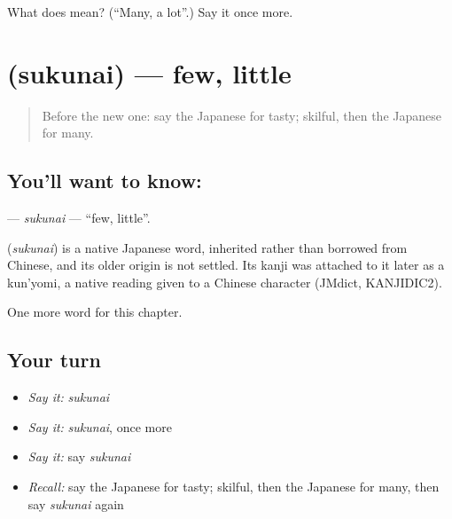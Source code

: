 \begin{tcolorbox}[breakable,colback=teal!4,colframe=teal!35!black,title={Before you move on}]
What does  mean? (\textquotedblleft{}Many, a lot\textquotedblright{}.) Say it once more.
\end{tcolorbox}
\section[\texorpdfstring{\ja{すくない} (sukunai)}{すくない (sukunai)}]{ (sukunai) — few, little}

\label{lesson:JA-C127-sukunai}



\begin{quote}
Before the new one: say the Japanese for tasty; skilful, then the Japanese for many.
\end{quote}

\subsection*{You'll want to know: }
\textbf{} — \emph{sukunai} — \textquotedblleft{}few, little\textquotedblright{}.

\begin{cousinweb}
\textbf{} (\emph{sukunai}) is a native Japanese word, inherited rather than borrowed from Chinese, and its older origin is not settled. Its kanji was attached to it later as a kun'yomi, a native reading given to a Chinese character (JMdict, KANJIDIC2).
\end{cousinweb}

\begin{grammarlens}[title={What you've built}]
One more word for this chapter.
\end{grammarlens}

\subsection*{Your turn}
\begin{itemize}
\raggedright
  \item \emph{Say it:} \emph{sukunai}
  \item \emph{Say it:} \emph{sukunai}, once more
  \item \emph{Say it:} say \emph{sukunai}
  \item \emph{Recall:} say the Japanese for tasty; skilful, then the Japanese for many, then say \emph{sukunai} again
\end{itemize}

